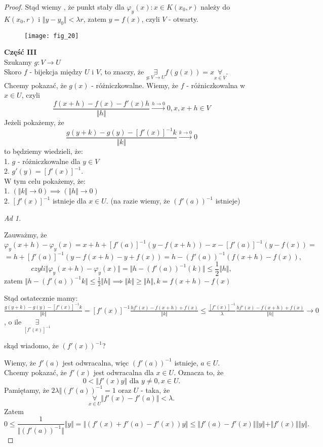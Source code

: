\documentclass[../main.tex]{subfiles}
\begin{document}
\begin{proof}
Stąd wiemy , że punkt stały dla $\varphi_y(x):x\in K(x_0,r)$ należy do $K(x_0,r)$ i $\Vert y - y_0 \Vert <\lambda r$, zatem $y=f(x)$, czyli $V$ - otwarty.

\begin{figure}[h]
    \centering
    \texttt{[image: fig\_20]}
    \caption{}
    \label{fig:fig_20}
\end{figure}

\textbf{Część III}\\
Szukamy $g: V\to U$\\
Skoro $f$ - bijekcja między $U$ i $V$, to znaczy, że $\underset{g: V\to U}{\exists}f(g(x)) = x \underset{x\in V}{\forall}$.\\
Chcemy pokazać, że $g(x)$ - różniczkowalne. Wiemy, że $f$ - różniczkowalna w $x\in U$, czyli
$$\frac{f(x+h) - f(x) - f'(x)h}{\Vert h \Vert} \overset{h\to 0}{\to} 0, x,x+h\in V$$
Jeżeli pokażemy, że
\begin{equation}
    \frac{g(y+k) - g(y) - [f'(x)]^{-1} k}{\Vert k \Vert} \overset{k\to 0}{\to} 0
\end{equation}
to będziemy wiedzieli, że:\\
1. $g$ - różniczkowalne dla $y\in V$\\
2. $g'(y)=[f'(x)]^{-1}$.\\
W tym celu pokażemy, że:\\
1. $(\Vert k \Vert \to 0) \implies (\Vert h \Vert \to 0)$\\
2. $[f'(x)]^{-1}$ istnieje dla $x\in U$. (na razie wiemy, że $(f'(a))^{-1}$ istnieje)

\begin{large}
    \textit{Ad 1.}
\end{large}
Zauważmy, że $$\varphi_y(x+h) - \varphi_y(x) = x+h+[f'(a)]^{-1}(y-f(x+h)) - x - [f'(a)]^{-1}(y-f(x))=$$
$$=h+[f'(a)]^{-1}(y-f(x+h)-y+f(x)) = h - (f'(a))^{-1}(f(x+h) - f(x)),$$
$$czyli \Vert \varphi_y(x+h) - \varphi_y(x) \Vert = \Vert h - (f'(a))^{-1}(k) \Vert \leq \frac{1}{2} \Vert h \Vert,$$
zatem $\Vert h - (f'(a))^{-1}k\Vert \leq \frac{1}{2}\Vert h \Vert \implies \Vert k \Vert \geq \Vert h \Vert, k = f(x+h) - f(x)$

Stąd ostatecznie mamy:
$\frac{g(y+k)-g(y) - [f'(x)]^{-1}k}{\Vert k \Vert} = [f'(x)]^{-1} \frac{hf'(x) - f(x+h) + f(x)}{\Vert k \Vert} \leq \frac{[f'(x)]^{-1}}{\lambda} \frac{hf'(x) - f(x+h) + f(x)}{\Vert h \Vert} \to 0$, o ile $\underset{[f'(x)]^{-1}}{\exists}$

\begin{pytanie}
    skąd wiadomo, że $(f'(x))^{-1}$?\\
\end{pytanie}
Wiemy, że $f'(a)$ jest odwracalna, więc $(f'(a))^{-1}$ istnieje, $a  \in U$.\\
Chcemy pokazać, że $f'(x)$ jest odwracalna dla $x\in U$. Oznacza to, że
\[
    0 < \Vert f'(x) y \Vert \text{ dla } y\neq 0, x\in U
.\]
Pamiętamy, że  $2\lambda \Vert (f'(a))^{-1} = 1$ oraz $U$ - taka, że
\[
    \underset{x\in U}{\forall} \Vert f'(x) - f'(a) \Vert < \lambda
.\]
Zatem \[
    0 \le \frac{1}{\Vert (f'(a))^{-1} \Vert } \Vert y \Vert = \Vert (f'(x) + f'(a) - f'(x))y \Vert \le \Vert f'(a) - f'(x) \Vert \Vert y \Vert + \Vert f'(x) \Vert \Vert y \Vert
.\]


\end{proof}
\end{document}
